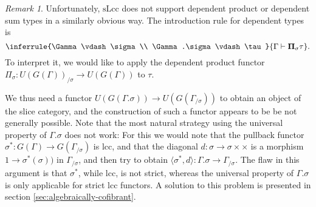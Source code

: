 \documentclass[a4paper]{article}
\theoremstyle{remark}
\newtheorem{remark}[theorem]{Remark}
\theoremstyle{definition}
\begin{document}
\begin{remark}
  \label{rem:slcc-slice-problem}
  Unfortunately, $\mathrm{sLcc}$ does not support dependent product or dependent sum types in a similarly obvious way.
  The introduction rule for dependent types is
  \begin{equation}
    \inferrule
    {\Gamma \vdash \sigma \\ \Gamma.\sigma \vdash \tau}
    {\Gamma \vdash \mathbf{\Pi}_\sigma \tau}.
  \end{equation}
  To interpret it, we would like to apply the dependent product functor $\Pi_\sigma : U(G(\Gamma))_{/ \sigma} \rightarrow U(G(\Gamma))$ to $\tau$.
  
  We thus need a functor $U(G(\Gamma.\sigma)) \rightarrow U(G(\Gamma_{/ \sigma}))$ to obtain an object of the slice category, and the construction of such a functor appears to be be not generally possible.
  Note that the most natural strategy using the universal property of $\Gamma.\sigma$ does not work:
  For this we would note that the pullback functor $\sigma^* : G(\Gamma) \rightarrow G(\Gamma_{/ \sigma})$ is lcc, and that the diagonal $d : \sigma \rightarrow \sigma \times \times$ is a morphism $1 \rightarrow \sigma^*(\sigma))$ in $\Gamma_{/ \sigma}$, and then try to obtain $\langle \sigma^*, d \rangle : \Gamma.\sigma \rightarrow \Gamma_{/ \sigma}$.
  The flaw in this argument is that $\sigma^*$, while lcc, is not strict, whereas the universal property of $\Gamma.\sigma$ is only applicable for strict lcc functors.
  A solution to this problem is presented in section \ref{sec:algebraically-cofibrant}.
\end{remark}
\end{document}
